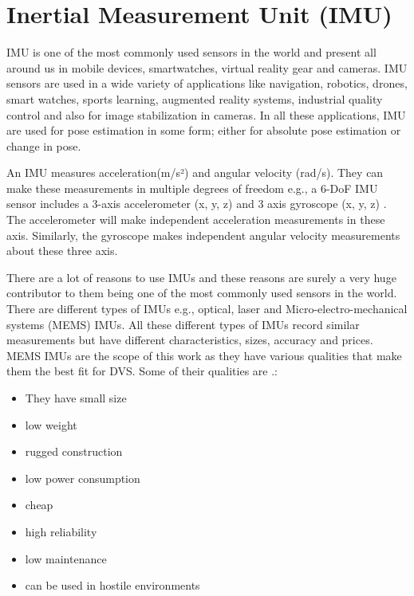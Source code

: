 \section{Inertial Measurement Unit (IMU)}
\label{sec:imu}
IMU is one of the most commonly used sensors in the world and present all around us in mobile devices, smartwatches, virtual reality gear and cameras. IMU sensors are used in a wide variety of applications like navigation, robotics, drones, smart watches, sports learning, augmented reality systems, industrial quality control \citep{ahmad2013reviews}  and also for image stabilization in cameras. In all these applications, IMU are used for pose estimation in some form; either for absolute pose estimation or change in pose.

An IMU measures acceleration(m/s²) and angular velocity (rad/s). They can make these measurements in multiple degrees of freedom e.g., a 6-DoF IMU sensor includes a 3-axis accelerometer (x, y, z) and 3 axis gyroscope (x, y, z) \citep{constant2021data}. The accelerometer will make independent acceleration measurements in these axis. Similarly, the gyroscope makes independent angular velocity measurements about these three axis.



There are a lot of reasons to use IMUs and these reasons are surely a very huge contributor to them being one of the most commonly used sensors in the world. There are different types of IMUs e.g., optical, laser and Micro-electro-mechanical systems (MEMS) IMUs. All these different types of IMUs record similar measurements but have different characteristics, sizes, accuracy and prices. MEMS IMUs are the scope of this work as they have various qualities that make them the best fit for DVS. Some of their qualities are \citep{woodman2007introduction}.:

\begin{itemize}
\item They have small size
\item low weight
\item rugged construction 
\item low power consumption 
\item cheap
\item high reliability 
\item low maintenance
\item can be used in hostile environments 
\end{itemize}

